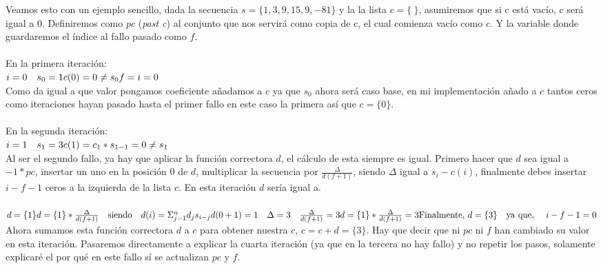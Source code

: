 Veamos esto con un ejemplo sencillo, dada la secuencia $s = \{ 1, 3, 9, 15, 9, -81 \}$ y la la lista $c = \{ \ \}$, asumiremos que si c está vacío, c será igual a 0. Definiremos como $pc$ (\textit{past c}) al conjunto que nos servirá como copia de c, el cual comienza vacío como $c$. Y la variable donde guardaremos el índice al fallo pasado como $f$.
\\\\
En la primera iteración: \\
\(i=0 \quad s_0 = 1 \\
c(0) = 0 \neq s_0\\
f = i = 0
\)\\
Como da igual a que valor pongamos coeficiente añadamos a $c$ ya que $s_0$ ahora será caso base, en mi implementación añado a $c$ tantos ceros como iteraciones hayan pasado hasta el primer fallo en este caso la primera así que $c = \{ 0 \}$.
\\\\
En la segunda iteración: \\
\(i=1 \quad s_1 = 3 \\
c(1) = c_1 * s_{1-1} = 0 \neq s_1\\
\)\\
Al ser el segundo fallo, ya hay que aplicar la función correctora $d$, el cálculo de esta siempre es igual. Primero hacer que $d$ sea igual a $-1 * pc$, insertar un uno en la posición 0 de $d$, multiplicar la secuencia por $\frac{\Delta}{d(f+1)}$, siendo $\Delta$ igual  a $s_i - c(i)$, finalmente debes insertar $i-f-1$ ceros a la izquierda de la lista $c$. En esta iteración $d$ sería igual a. \\\\
\(d = \{ 1 \} \\
 d = \{ 1 \} *  \frac{\Delta}{d(f+1)} \quad \text{siendo} \quad d(i) = \Sigma_{j=1}^n d_js_{i-j} \\
 d(0+1) = 1 \quad \Delta = 3 \quad \frac{\Delta}{d(f+1)} = 3 \\
 d = \{ 1 \} *  \frac{\Delta}{d(f+1)} = 3 \\
 \text{Finalmente, }
 d = \{ 3 \}  \quad \text{ya que, }  \quad i -f -1 = 0
\)\\
Ahora sumamos esta función correctora $d$ a $c$ para obtener nuestra $c$, $c = c + d = \{3\}$. Hay que decir que ni $pc$ ni $f$ han cambiado su valor en esta iteración. Pasaremos directamente a explicar la cuarta iteración (ya que en la tercera no hay fallo) y no repetir los pasos, solamente explicaré el por qué en este fallo sí se actualizan $pc$ y $f$. 
